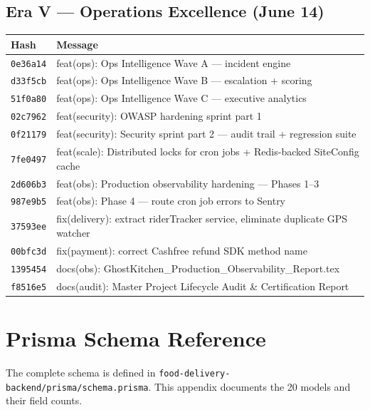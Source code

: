 \documentclass[11pt,a4paper,twoside]{book}
\newcommand{\th}[1]{\textbf{\color{white}#1}}
\begin{document}
\section{Era V — Operations Excellence (June 14)}

\begin{center}\footnotesize
\begin{longtable}{p{2cm}p{10.5cm}}
\toprule
\rowcolor{headbg}\th{Hash} & \th{Message} \\
\midrule
\texttt{0e36a14} & feat(ops): Ops Intelligence Wave A — incident engine \\
\rowcolor{rowalt}\texttt{d33f5cb} & feat(ops): Ops Intelligence Wave B — escalation + scoring \\
\texttt{51f0a80} & feat(ops): Ops Intelligence Wave C — executive analytics \\
\rowcolor{rowalt}\texttt{02c7962} & feat(security): OWASP hardening sprint part 1 \\
\texttt{0f21179} & feat(security): Security sprint part 2 — audit trail + regression suite \\
\rowcolor{rowalt}\texttt{7fe0497} & feat(scale): Distributed locks for cron jobs + Redis-backed SiteConfig cache \\
\texttt{2d606b3} & feat(obs): Production observability hardening — Phases 1--3 \\
\rowcolor{rowalt}\texttt{987e9b5} & feat(obs): Phase 4 — route cron job errors to Sentry \\
\texttt{37593ee} & fix(delivery): extract riderTracker service, eliminate duplicate GPS watcher \\
\rowcolor{rowalt}\texttt{00bfc3d} & fix(payment): correct Cashfree refund SDK method name \\
\texttt{1395454} & docs(obs): GhostKitchen\_Production\_Observability\_Report.tex \\
\rowcolor{rowalt}\texttt{f8516e5} & docs(audit): Master Project Lifecycle Audit \& Certification Report \\
\bottomrule
\end{longtable}
\end{center}

\chapter{Prisma Schema Reference}

The complete schema is defined in \texttt{food-delivery-backend/prisma/schema.prisma}.
This appendix documents the 20 models and their field counts.
\end{document}
